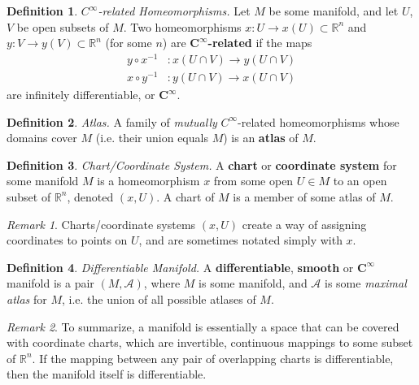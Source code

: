 \documentclass[10pt,landscape]{article}
\theoremstyle{definition}
\newtheorem{definition}{Definition}[section]
\theoremstyle{remark}
\newtheorem*{remark}{Remark}
\newcommand{\Rn}{\mathbb{R}^n}
\newcommand{\Ci}{C^\infty}
\begin{document}
\begin{multicols*}{3}
\theoremstyle{definition}
\begin{definition}{\textit{$C^\infty$-related Homeomorphisms.}}
Let $M$ be some manifold, and let $U$, $V$ be open subsets of $M$. Two homeomorphisms $x:U\rightarrow x(U)\subset\Rn$ and $y:V\rightarrow y(V) \subset \Rn$ (for some $n$) are $\bm{\Ci}$\textbf{-related} if the maps
\begin{align}
    y \circ x^{-1} &: x(U\cap V) \rightarrow y(U\cap V)\\
    x \circ y^{-1} &: y(U\cap V) \rightarrow x(U\cap V)
\end{align}
are infinitely differentiable, or $\bm{\Ci}$.
\end{definition}

\theoremstyle{definition}
\begin{definition}{\textit{Atlas.}}
A family of \textit{mutually} $\Ci$-related homeomorphisms whose domains cover $M$ (i.e. their union equals $M$) is an \textbf{atlas} of $M$.
\end{definition}

\theoremstyle{definition}
\begin{definition}{\textit{Chart/Coordinate System.}}
A \textbf{chart} or \textbf{coordinate system} for some manifold $M$ is a homeomorphism $x$ from some open $U\in M$ to an open subset of $\Rn$, denoted $(x, U)$. A chart of $M$ is a member of some atlas of $M$.
\end{definition}

\begin{remark}
Charts/coordinate systems $(x, U)$ create a way of assigning coordinates to points on $U$, and are sometimes notated simply with $x$.
\end{remark}

\theoremstyle{definition}
\begin{definition}{\textit{Differentiable Manifold.}}
A \textbf{differentiable}, \textbf{smooth} or $\bm{C^\infty}$ manifold is a pair $(M, \mathcal{A})$, where $M$ is some manifold, and $\mathcal{A}$ is some \textit{maximal atlas} for $M$, i.e. the union of all possible atlases of $M$. 
\end{definition}


\begin{remark}
To summarize, a manifold is essentially a space that can be covered with coordinate charts, which are invertible, continuous mappings to some subset of $\Rn$. If the mapping between any pair of overlapping charts is differentiable, then the manifold itself is differentiable.
\end{remark}


\end{multicols*}
\end{document}
